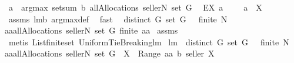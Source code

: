 \begin{isabellebody}
{\isacharampersand}\ {\isacharparenleft}a\ {\isasymin}\ argmax\ {\isacharparenleft}setsum\ b{\isacharparenright}\ {\isacharparenleft}allAllocations\ {\isacharparenleft}{\isacharbraceleft}seller{\isacharbraceright}{\isasymunion}N{\isacharparenright}\ {\isacharparenleft}set\ G{\isacharparenright}{\isacharparenright}{\isacharparenright}\isanewline
{\isacharparenright}{\isachardoublequoteclose}\ {\isacharparenleft}\ {\isachardoublequoteopen}EX\ a{\isachardot}\ {\isacharunderscore}\ {\isacharampersand}\ {\isacharunderscore}\ {\isacharampersand}\ a\ {\isasymin}\ {\isacharquery}X{\isachardoublequoteclose}{\isacharparenright}\isanewline
%
\isadelimproof
%
\endisadelimproof
%
\isatagproof
{}\isamarkupfalse%
\ assms\ lm{}{}b\ argmax{\isacharunderscore}def\ \isamarkupfalse%
\ fast%
\endisatagproof
{\isafoldproof}%
%
\isadelimproof
\isanewline
%
\endisadelimproof
\isanewline
{}\isamarkupfalse%
\ \ {\isachardoublequoteopen}distinct\ G{\isachardoublequoteclose}\ {\isachardoublequoteopen}set\ G\ {\isasymnoteq}\ {\isacharbraceleft}{\isacharbraceright}{\isachardoublequoteclose}\ {\isachardoublequoteopen}finite\ N{\isachardoublequoteclose}\ \ \isanewline
{\isachardoublequoteopen}{\isasymforall}aa{\isasymin}allAllocations\ {\isacharparenleft}{\isacharbraceleft}seller{\isacharbraceright}{\isasymunion}N{\isacharparenright}\ {\isacharparenleft}set\ G{\isacharparenright}{\isachardot}\ finite\ aa{\isachardoublequoteclose}\isanewline
%
\isadelimproof
%
\endisadelimproof
%
\isatagproof
{}\isamarkupfalse%
\ assms\ \isamarkupfalse%
\ {\isacharparenleft}metis\ List{\isachardot}finite{\isacharunderscore}set\ UniformTieBreaking{\isachardot}lm{}{}{\isacharparenright}%
\endisatagproof
{\isafoldproof}%
%
\isadelimproof
\isanewline
%
\endisadelimproof
\isanewline
{}\isamarkupfalse%
\ lm{}{}{\isacharcolon}\ \ {\isachardoublequoteopen}distinct\ G{\isachardoublequoteclose}\ {\isachardoublequoteopen}set\ G\ {\isasymnoteq}\ {\isacharbraceleft}{\isacharbraceright}{\isachardoublequoteclose}\ {\isachardoublequoteopen}finite\ N{\isachardoublequoteclose}\ \isanewline
{\isachardoublequoteopen}{\isasymforall}aa{\isasymin}allAllocations\ {\isacharparenleft}{\isacharbraceleft}seller{\isacharbraceright}{\isasymunion}N{\isacharparenright}\ {\isacharparenleft}set\ G{\isacharparenright}{\isachardot}\ {\isasymforall}\ X\ {\isasymin}\ Range\ aa{\isachardot}\ b\ {\isacharparenleft}seller{\isacharcomma}\ X{\isacharparenright}{\isacharequal}{}{\isachardoublequoteclose}\isanewline

\end{isabellebody}
